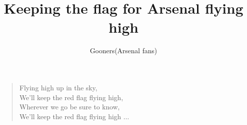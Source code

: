 \documentclass[a4paper,12pt]{article}
\title{Keeping the flag for Arsenal flying high}
\author{Gooners(Arsenal fans)}
\date{}
\begin{document}
	
	\maketitle
	
	\begin{verse}
		
		Flying high up in the sky, \\
		We'll keep the red flag flying high, \\
		Wherever we go be sure to know, \\
		We'll keep the red flag flying high $\ldots$
		
	\end{verse}
\end{document}
